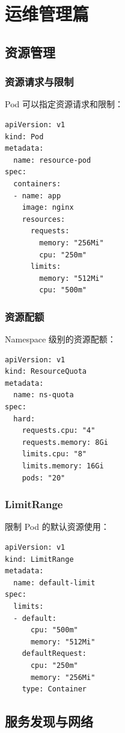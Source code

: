 \documentclass[12pt,UTF8]{ctexbook}
\begin{document}
\part{运维管理篇}

\chapter{资源管理}
\label{chap:resource_management}

\section{资源请求与限制}
\label{sec:resource_requests}

Pod 可以指定资源请求和限制：

\begin{lstlisting}
apiVersion: v1
kind: Pod
metadata:
  name: resource-pod
spec:
  containers:
  - name: app
    image: nginx
    resources:
      requests:
        memory: "256Mi"
        cpu: "250m"
      limits:
        memory: "512Mi"
        cpu: "500m"
\end{lstlisting}

\section{资源配额}
\label{sec:resource_quota}

Namespace 级别的资源配额：

\begin{lstlisting}
apiVersion: v1
kind: ResourceQuota
metadata:
  name: ns-quota
spec:
  hard:
    requests.cpu: "4"
    requests.memory: 8Gi
    limits.cpu: "8"
    limits.memory: 16Gi
    pods: "20"
\end{lstlisting}

\section{LimitRange}
\label{sec:limitrange}

限制 Pod 的默认资源使用：

\begin{lstlisting}
apiVersion: v1
kind: LimitRange
metadata:
  name: default-limit
spec:
  limits:
  - default:
      cpu: "500m"
      memory: "512Mi"
    defaultRequest:
      cpu: "250m"
      memory: "256Mi"
    type: Container
\end{lstlisting}

\chapter{服务发现与网络}
\label{chap:service_discovery}
\end{document}
